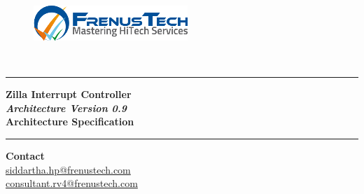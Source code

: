 \begin{titlepage}

\vspace{1cm}
\begin{figure}[H]
\centering
\includegraphics[totalheight=2cm]{images/frenustechLogo50-1.png}
\end{figure}
\vspace{0.5cm}

\begin{center}
\Large{\textsc{\\}}
\hrule %
\vspace{0.1in}
\begin{flushright}
\Huge{ \textbf {Zilla Interrupt Controller}}\\[0.25cm]
\normalsize{\textit{\textbf{ Architecture Version 0.9}}}\\[1cm]
\large{\textbf{Architecture Specification}}
\end{flushright}
\vspace{0.1in}
\hrule
\end{center}

\vspace{14cm}

\begin{flushright}
\textbf{Contact\\} 
\url{siddartha.hp@frenustech.com}\\
\url{consultant.rv4@frenustech.com}

\end{flushright}


\end{titlepage}